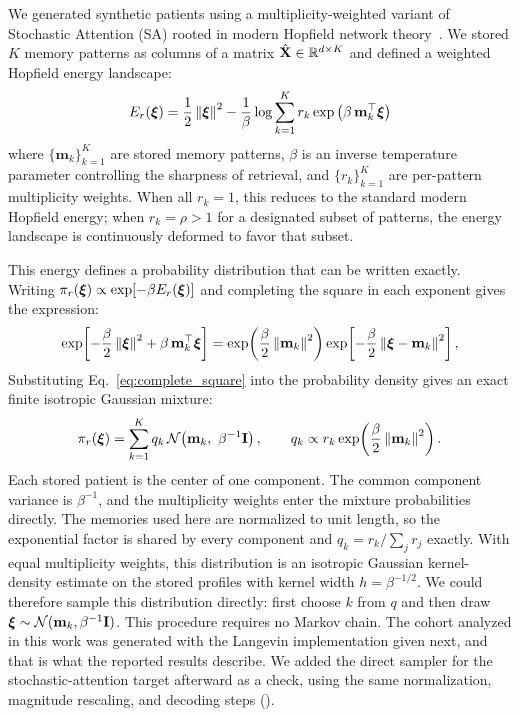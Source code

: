 We generated synthetic patients using a multiplicity-weighted variant of Stochastic
Attention (SA) rooted in modern Hopfield network theory~\citep{Ramsauer2021}. We
stored $K$ memory patterns as columns of a matrix $\hat{\mathbf{X}}\in\mathbb{R}^{d\times K}$ and
defined a weighted Hopfield energy landscape:
\begin{equation}
    E_r(\boldsymbol{\xi}) = \frac{1}{2}\left\lVert \boldsymbol{\xi} \right\rVert^2
    - \frac{1}{\beta}\log\sum_{k=1}^{K} r_k \exp\left(\beta\,\mathbf{m}_k^\top\boldsymbol{\xi}\right)
    \label{eq:hopfield_energy}
\end{equation}
where $\{\mathbf{m}_k\}_{k=1}^K$ are stored memory patterns, $\beta$ is an inverse
temperature parameter controlling the sharpness of retrieval, and $\{r_k\}_{k=1}^K$
are per-pattern multiplicity weights. When all $r_k = 1$, this reduces to the standard
modern Hopfield energy; when $r_k = \rho > 1$ for a designated subset of patterns, the
energy landscape is continuously deformed to favor that subset.

This energy defines a probability distribution that can be written exactly. Writing
$\pi_r(\boldsymbol{\xi})\propto\exp[-\beta E_r(\boldsymbol{\xi})]$ and completing the square in each exponent gives
the expression:
\begin{equation}
    \exp\!\left[-\frac{\beta}{2}\left\lVert \boldsymbol{\xi} \right\rVert^2 + \beta\,\mathbf{m}_k^\top\boldsymbol{\xi}\right]
    = \exp\!\left(\frac{\beta}{2}\left\lVert \mathbf{m}_k \right\rVert^2\right)
      \exp\!\left[-\frac{\beta}{2}\left\lVert \boldsymbol{\xi}-\mathbf{m}_k \right\rVert^2\right],
    \label{eq:complete_square}
\end{equation}
Substituting Eq.~\eqref{eq:complete_square} into the probability density gives an exact
finite isotropic Gaussian mixture:
\begin{equation}
    \pi_r(\boldsymbol{\xi}) = \sum_{k=1}^{K} q_k\,
    \mathcal{N}\!\left(\mathbf{m}_k,\ \beta^{-1}\mathbf{I}\right),
    \qquad
    q_k \propto r_k\exp\!\left(\frac{\beta}{2}\left\lVert \mathbf{m}_k \right\rVert^2\right).
    \label{eq:exact_mixture}
\end{equation}
Each stored patient is the center of one component. The common component variance is
$\beta^{-1}$, and the multiplicity weights enter the mixture probabilities directly. The
memories used here are normalized to unit length, so the exponential factor is shared by
every component and $q_k = r_k/\sum_j r_j$ exactly. With equal multiplicity weights, this distribution is an isotropic Gaussian
kernel-density estimate on the stored profiles with kernel width $h=\beta^{-1/2}$. We could therefore sample this
distribution directly: first choose $k$ from $q$ and then draw
$\boldsymbol{\xi}\sim\mathcal{N}(\mathbf{m}_k,\beta^{-1}\mathbf{I})$. This procedure requires no Markov
chain. The cohort
analyzed in this work was generated with the Langevin implementation given next, and that is
what the reported results describe. We added the direct sampler for the stochastic-attention
target afterward as a check,
using the same normalization, magnitude rescaling, and decoding steps
().

